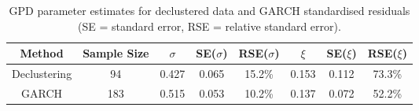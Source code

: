 \begin{table}[!h]
\centering
\caption{GPD parameter estimates for declustered data 
  and GARCH standardised residuals (SE = standard error, 
  RSE = relative standard error).}
\centering
\begin{tabular}[t]{cccccccc}
\toprule
Method & Sample Size & $\sigma$ & SE($\sigma$) & RSE($\sigma$) & $\xi$ & SE($\xi$) & RSE($\xi$)\\
\midrule
Declustering & 94 & 0.427 & 0.065 & 15.2\% & 0.153 & 0.112 & 73.3\%\\
GARCH & 183 & 0.515 & 0.053 & 10.2\% & 0.137 & 0.072 & 52.2\%\\
\bottomrule
\end{tabular}
\end{table}
